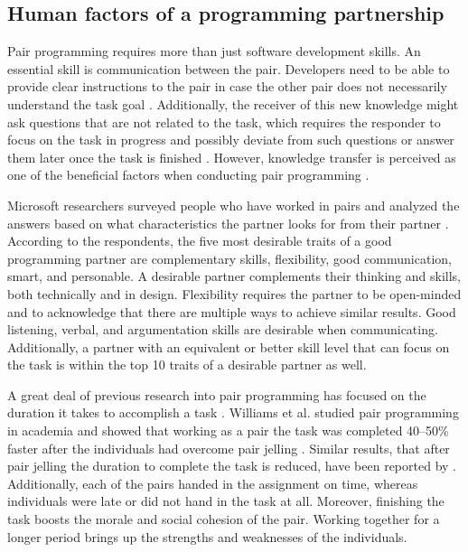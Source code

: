 \documentclass[conference]{IEEEtran}
\begin{document}
\subsection{Human factors of a programming partnership}

Pair programming requires more than just software development skills. An essential skill is communication between the pair. Developers need to be able to provide clear instructions to the pair in case the other pair does not necessarily understand the task goal \cite{10.1145/2652524.2652529}. Additionally, the receiver of this new knowledge might ask questions that are not related to the task, which requires the responder to focus on the task in progress and possibly deviate from such questions or answer them later once the task is finished \cite{10.1145/2652524.2652529}. However, knowledge transfer is perceived as one of the beneficial factors when conducting pair programming \cite{10.1145/2652524.2652529}.

Microsoft researchers surveyed people who have worked in pairs and analyzed the answers based on what characteristics the partner looks for from their partner \cite{10.1145/1414004.1414026}. According to the respondents, the five most desirable traits of a good programming partner are complementary skills, flexibility, good communication, smart, and personable. A desirable partner complements their thinking and skills, both technically and in design. Flexibility requires the partner to be open-minded and to acknowledge that there are multiple ways to achieve similar results. Good listening, verbal, and argumentation skills are desirable when communicating. Additionally, a partner with an equivalent or better skill level that can focus on the task is within the top 10 traits of a desirable partner as well.

A great deal of previous research into pair programming has focused on the duration it takes to accomplish a task \cite{10.1145/2652524.2652529, Williams2000Strengthening, Hannay2009effectiveness}. Williams et al. studied pair programming in academia and showed that working as a pair the task was completed 40--50\% faster after the individuals had overcome pair jelling \cite{Williams2000Strengthening}. Similar results, that after pair jelling the duration to complete the task is reduced, have been reported by \cite{1541842}. Additionally, each of the pairs handed in the assignment on time, whereas individuals were late or did not hand in the task at all. Moreover, finishing the task boosts the morale and social cohesion of the pair. Working together for a longer period brings up the strengths and weaknesses of the individuals.
\end{document}
